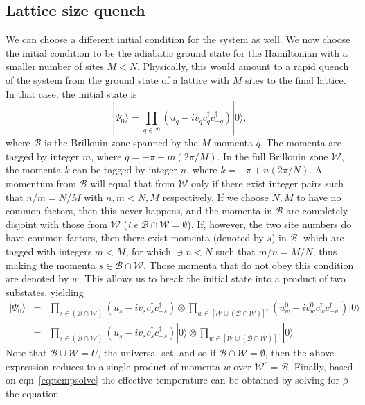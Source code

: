 \documentclass[a4paper,10pt]{article}
\begin{document}
\subsection{Lattice size quench}
We can choose a different initial condition for the system as well. We now choose the initial condition to be the adiabatic ground state for the Hamiltonian with a smaller number of sites $M<N$. Physically, this would amount to a rapid quench of the system from the ground state of a lattice with $M$ sites to the final lattice. In that case, the initial state is 
\begin{equation}
 |\Psi_0\rangle = \prod_{q\in \mathcal{B}} \left(u_q-iv_qc^\dagger_{q}c^\dagger_{-q}\right)|0\rangle,
\end{equation}
where $\mathcal{B}$ is the Brillouin zone spanned by the $M$ momenta $q$. The momenta are tagged by integer $m$, where $q=-\pi+m (2\pi/M)$. In the full Brillouin zone $\mathcal{W}$, the momenta $k$ can be tagged by integer $n$, where $k=-\pi+n (2\pi/N)$. A momentum from $\mathcal{B}$ will equal that from $\mathcal{W}$ only if there exist integer pairs such that $n/m = N/M$ with $n,m<N,M$ respectively. If we choose $N,M$ to have no common factors, then this never happens, and the momenta in $\mathcal{B}$ are completely disjoint with those from $\mathcal{W}$ (\textit{i.e} $\mathcal{B}\cap\mathcal{W}=\emptyset$). If, however, the two site numbers do have common factors, then there exist momenta (denoted by $s$) in $\mathcal{B}$, which are tagged with integers $m<M$, for which $\ni n<N$ such that $m/n=M/N$, thus making the momenta $s\in\mathcal{B}\cap\mathcal{W}$. Those momenta that do not obey this condition are denoted by $w$. This allows us to break the initial state into a product of two substates, yielding
\begin{eqnarray}
 \label{eq:ic2}
 |\Psi_0\rangle &=& \prod_{s\in{\left(\mathcal{B}\cap\mathcal{W}\right)}} \left(u_s-iv_sc^\dagger_sc^\dagger_{-s}\right)\otimes\prod_{w\in{\left[\mathcal{W}\cup\left(\mathcal{B}\cap\mathcal{W}\right)\right]^c}} \left(u^0_w-iv^0_wc^\dagger_wc^\dagger_{-w}\right) |0\rangle \nonumber \\
 &=& \prod_{s\in{\left(\mathcal{B}\cap\mathcal{W}\right)}} \left(u_s-iv_sc^\dagger_sc^\dagger_{-s}\right)|0\rangle \otimes\prod_{w\in{\left[\mathcal{W}\cup\left(\mathcal{B}\cap\mathcal{W}\right)\right]^c}} |0\rangle
\end{eqnarray}
Note that $\mathcal{B}\cup\mathcal{W}=U$, the universal set, and so if $\mathcal{B}\cap\mathcal{W}=\emptyset$, then the above expression reduces to a single product of momenta $w$ over $\mathcal{W}^c=\mathcal{B}$. Finally, based on eqn~\ref{eq:tempsolve} the effective temperature can be obtained by solving for $\beta$ the equation
\end{document}
